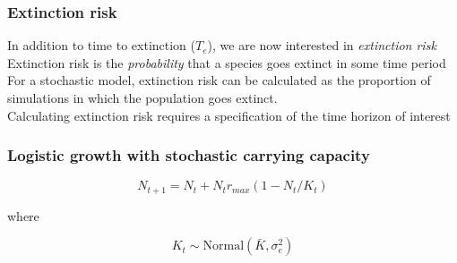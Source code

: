 \documentclass[color=usenames,dvipsnames]{beamer}\usepackage[]{graphicx}\usepackage[]{color}
\begin{document}
\begin{frame}
  \frametitle{Extinction risk}
  \Large
  In addition to time to extinction ($T_e$), we are now
      interested in \textit{extinction risk} \\
  \pause \vfill
  Extinction risk is the \textit{probability} that a species goes
      extinct in some time period \\
  \pause \vfill
  For a stochastic model, extinction risk can be
      calculated as the proportion of simulations in which the
      population goes extinct. \\
  \pause \vfill
  Calculating extinction risk requires a specification of
      the time horizon of interest
\end{frame}









\begin{frame}
  \frametitle{Logistic growth with stochastic carrying capacity}
  \LARGE
\[
  N_{t+1} = N_t + N_tr_{max}(1 - N_t/K_t)
\]

\vspace{0.3cm}
{\large \centering where \par}
\[
  K_t \sim \mbox{Normal}(\bar{K}, \sigma_e^2)
\]
\end{frame}
\end{document}
